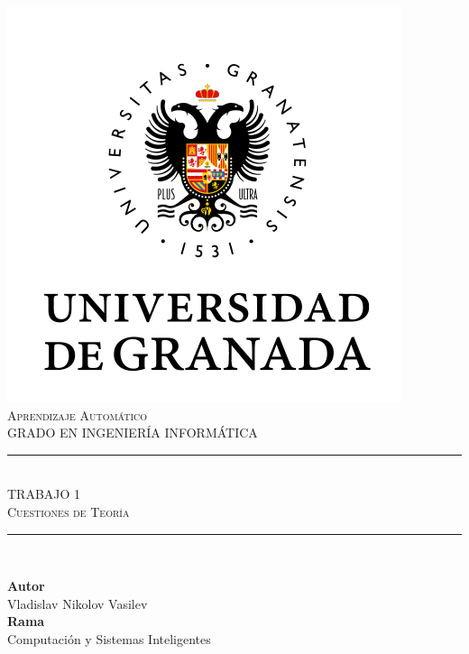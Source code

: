 \documentclass[11pt,a4paper]{article}
\begin{document}

\begin{titlepage}

\begin{minipage}{\textwidth}

\centering

\includegraphics[scale=0.5]{img/ugr.png}\\

\textsc{\Large Aprendizaje Automático\\[0.2cm]}
\textsc{GRADO EN INGENIERÍA INFORMÁTICA}\\[1cm]

\noindent\rule[-1ex]{\textwidth}{1pt}\\[1.5ex]
\textsc{{\Huge TRABAJO 1\\[0.5ex]}}
\textsc{{\Large Cuestiones de Teoría\\}}
\noindent\rule[-1ex]{\textwidth}{2pt}\\[3.5ex]

\end{minipage}

\vspace{0.5cm}

\begin{minipage}{\textwidth}

\centering

\textbf{Autor}\\ {Vladislav Nikolov Vasilev}\\[2.5ex]
\textbf{Rama}\\ {Computación y Sistemas Inteligentes}\\[2.5ex]
\vspace{0.3cm}


\end{minipage}
\end{titlepage}
\end{document}
